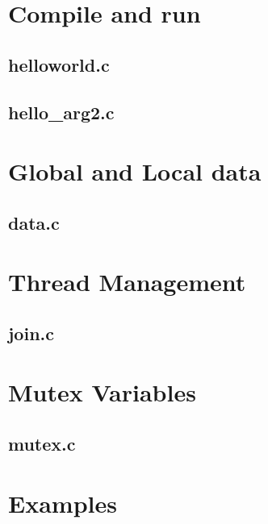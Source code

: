 \chapter{Compile and run}

\section{helloworld.c}



\section{hello\_arg2.c}



\chapter{Global and Local data}

\section{data.c}



\chapter{Thread Management}

\section{join.c}



\chapter{Mutex Variables}

\section{mutex.c}
  


\chapter{Examples}

